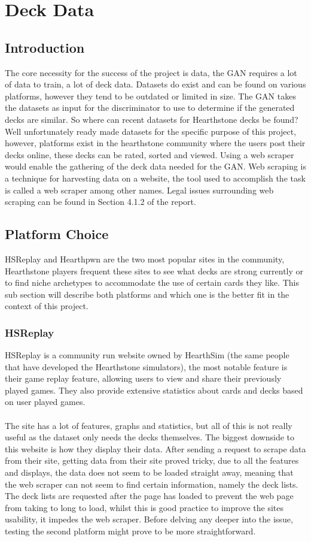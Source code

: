 \documentclass{report} %
\begin{document}
\section{Deck Data}
\subsection{Introduction}
The core necessity for the success of the project is data, the GAN requires a lot of data to train, a lot of deck data. Datasets do exist and can be found on various platforms, however they tend to be outdated or limited in size. The GAN takes the datasets as input for the discriminator to use to determine if the generated decks are similar. So where can recent datasets for Hearthstone decks be found? Well unfortunately ready made datasets for the specific purpose of this project, however, platforms exist in the hearthstone community where the users post their decks online, these decks can be rated, sorted and viewed. Using a web scraper would enable the gathering of the deck data needed for the GAN. Web scraping is a technique for harvesting data on a website, the tool used to accomplish the task is called a web scraper among other names. Legal issues surrounding web scraping can be found in Section 4.1.2 of the report.
\subsection{Platform Choice}
HSReplay and Hearthpwn are the two most popular sites in the community, Hearthstone players frequent these sites to see what decks are strong currently or to find niche archetypes to accommodate the use of certain cards they like. This sub section will describe both platforms and which one is the better fit in the context of this project.
\subsubsection{HSReplay}
HSReplay is a community run website owned by HearthSim (the same people that have developed the Hearthstone simulators), the most notable feature is their game replay feature, allowing users to view and share their previously played games. They also provide extensive statistics about cards and decks based on user played games. \\ \\
The site has a lot of features, graphs and statistics, but all of this is not really useful as the dataset only needs the decks themselves. The biggest downside to this website is how they display their data. After sending a request to scrape data from their site, getting data from their site proved tricky, due to all the features and displays, the data does not seem to be loaded straight away, meaning that the web scraper can not seem to find certain information, namely the deck lists. The deck lists are requested after the page has loaded to prevent the web page from taking to long to load, whilst this is good practice to improve the sites usability, it impedes the web scraper.  Before delving any deeper into the issue, testing the second platform might prove to be more straightforward. 
\end{document}
